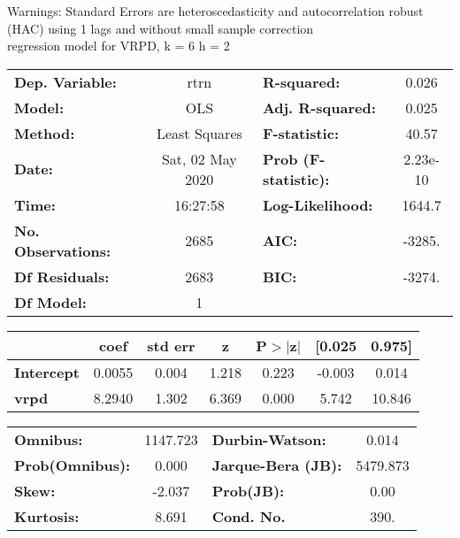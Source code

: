 Warnings: \newline
 [1] Standard Errors are heteroscedasticity and autocorrelation robust (HAC) using 1 lags and without small sample correction\\ 

regression model for VRPD, k = 6 h = 2\begin{center}
\begin{tabular}{lclc}
\toprule
\textbf{Dep. Variable:}    &       rtrn       & \textbf{  R-squared:         } &     0.026   \\
\textbf{Model:}            &       OLS        & \textbf{  Adj. R-squared:    } &     0.025   \\
\textbf{Method:}           &  Least Squares   & \textbf{  F-statistic:       } &     40.57   \\
\textbf{Date:}             & Sat, 02 May 2020 & \textbf{  Prob (F-statistic):} &  2.23e-10   \\
\textbf{Time:}             &     16:27:58     & \textbf{  Log-Likelihood:    } &    1644.7   \\
\textbf{No. Observations:} &        2685      & \textbf{  AIC:               } &    -3285.   \\
\textbf{Df Residuals:}     &        2683      & \textbf{  BIC:               } &    -3274.   \\
\textbf{Df Model:}         &           1      & \textbf{                     } &             \\
\bottomrule
\end{tabular}
\begin{tabular}{lcccccc}
                   & \textbf{coef} & \textbf{std err} & \textbf{z} & \textbf{P$> |$z$|$} & \textbf{[0.025} & \textbf{0.975]}  \\
\midrule
\textbf{Intercept} &       0.0055  &        0.004     &     1.218  &         0.223        &       -0.003    &        0.014     \\
\textbf{vrpd}      &       8.2940  &        1.302     &     6.369  &         0.000        &        5.742    &       10.846     \\
\bottomrule
\end{tabular}
\begin{tabular}{lclc}
\textbf{Omnibus:}       & 1147.723 & \textbf{  Durbin-Watson:     } &    0.014  \\
\textbf{Prob(Omnibus):} &   0.000  & \textbf{  Jarque-Bera (JB):  } & 5479.873  \\
\textbf{Skew:}          &  -2.037  & \textbf{  Prob(JB):          } &     0.00  \\
\textbf{Kurtosis:}      &   8.691  & \textbf{  Cond. No.          } &     390.  \\
\bottomrule
\end{tabular}
\end{center}

